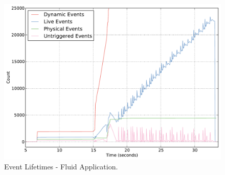 

\begin{figure}
\begin{center}
\includegraphics[scale=0.33]{figs/event_lifetimes.pdf}
\end{center}
\vspace{-6mm}
\caption{Event Lifetimes - Fluid Application.\label{fig:eventlife}}
\vspace{-4mm}
\end{figure}

